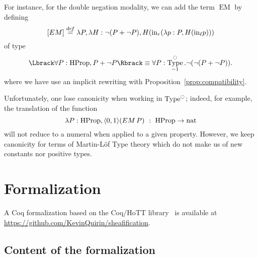\documentclass[preprint,9pt,numbers]{sigplanconf}
\newcommand \defeq {\overset{de\hspace{-0.2ex}f}{=}}
\DeclareMathOperator{\Type}{Type}
\DeclareMathOperator{\HProp}{HProp}
\DeclareMathOperator{\nat}{nat}
\newcommand{\modal}{\ensuremath{\ocircle}}
\newenvironment{mymath}[1][-0em]{%
  \newcommand\mymathaux{\vspace{#1}}%
  \vspace{#1}%
  \begin{equation*}%
  }{ %
    \mymathaux%
  \end{equation*}}
\begin{document}
For instance, for the double negation modality, we can add the term
$\mathop{EM}$ by defining 
$$
[\mathop{EM}] \defeq \lambda P, \lambda H : \lnot (P + \lnot P), H (\mathrm{in}_r (\lambda
p : P, H (\mathrm{in}_\ell p)))
$$
of type 
$$
\Lbrack \forall P:\HProp, P + \lnot P \Rbrack \equiv \forall
P:\Type^\modal_{-1}. \lnot (\lnot (P + \lnot P)).
$$
where we have use an implicit rewriting with
Proposition~\ref{prop:compatibility}.

Unfortunately, one lose canonicity when working in $\Type^\modal$;
indeed, for example, the translation of the function 
\begin{mymath}
\lambda P:\HProp, \langle 0 ,1\rangle (\mathop{EM} P)~:~\HProp
                     \to \nat\end{mymath}%
will not reduce to a numeral when applied to a given
property. However, we keep canonicity for terms of Martin-Löf Type
theory which do not make us of new constants nor positive types. 
%

\section{Formalization} 
\label{sec:formalization}

A Coq formalization based on the Coq/HoTT library~\cite{hottlib} is available at
\url{https://github.com/KevinQuirin/sheafification}.
%

\subsection{Content of the formalization}
\label{sec:cont-form}
\end{document}
